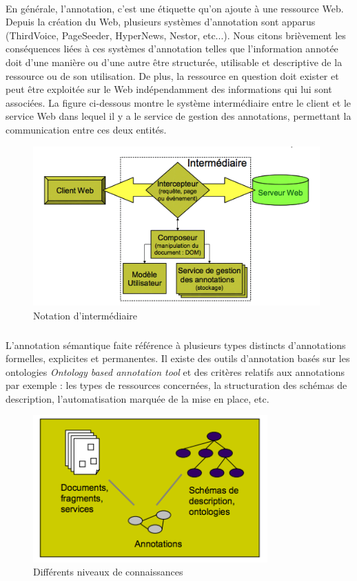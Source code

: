 \paragraph{}
En générale, l'annotation, c'est une étiquette qu'on ajoute à une ressource Web. Depuis la création du Web, plusieurs systèmes d'annotation sont apparus (ThirdVoice, PageSeeder, HyperNews, Nestor, etc...).
Nous citons brièvement les conséquences liées à ces systèmes d'annotation telles que l'information annotée doit d'une manière ou d'une autre être structurée, utilisable et descriptive de la ressource ou de son utilisation. De plus, la ressource en question doit exister et peut être exploitée sur le Web indépendamment des informations qui lui sont associées. La figure ci-dessous montre le système intermédiaire entre le client et le service Web dans lequel il y a le service de gestion des annotations, permettant la communication entre ces deux entités.
\begin{figure}[H]
\centering
\includegraphics[width=11cm]{AnnotationSys.png}
\caption{Notation d'intermédiaire}
\end{figure}
\subparagraph{}
L'annotation sémantique faite référence à plusieurs types distincts d'annotations formelles, explicites et permanentes. Il existe des outils d'annotation basés sur les ontologies {\it Ontology based annotation tool}
et des critères relatifs aux annotations par exemple : les types de ressources concernées, la structuration des schémas de description, l'automatisation marquée de la mise en place, etc.
\begin{figure}[H]
\centering
\includegraphics[width=9cm]{diffConnaissances.png}
\caption{Différents niveaux de connaissances}
\end{figure}
